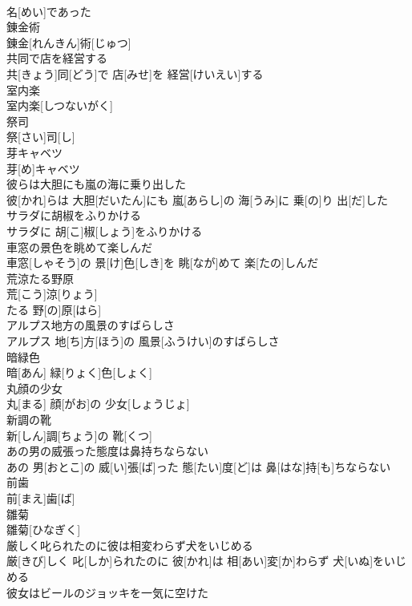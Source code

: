 \documentclass[8pt]{extreport}
\begin{document}
\begin{CJK}{UTF8}{min}
\\	名[めい]であった
\\	錬金術	
\\	錬金[れんきん]術[じゅつ]
\\	共同で店を経営する	
\\	共[きょう]同[どう]で 店[みせ]を 経営[けいえい]する
\\	室内楽	
\\	室内楽[しつないがく]
\\	祭司	
\\	祭[さい]司[し]
\\	芽キャベツ	
\\	芽[め]キャベツ
\\	彼らは大胆にも嵐の海に乗り出した	
\\	彼[かれ]らは 大胆[だいたん]にも 嵐[あらし]の 海[うみ]に 乗[の]り 出[だ]した
\\	サラダに胡椒をふりかける	
\\	サラダに 胡[こ]椒[しょう]をふりかける
\\	車窓の景色を眺めて楽しんだ	
\\	車窓[しゃそう]の 景[け]色[しき]を 眺[なが]めて 楽[たの]しんだ
\\	荒涼たる野原	
\\	荒[こう]涼[りょう]
\\	たる 野[の]原[はら]
\\	アルプス地方の風景のすばらしさ	
\\	アルプス 地[ち]方[ほう]の 風景[ふうけい]のすばらしさ
\\	暗緑色	
\\	暗[あん] 緑[りょく]色[しょく]
\\	丸顔の少女	
\\	丸[まる] 顔[がお]の 少女[しょうじょ]
\\	新調の靴	
\\	新[しん]調[ちょう]の 靴[くつ]
\\	あの男の威張った態度は鼻持ちならない	
\\	あの 男[おとこ]の 威[い]張[ば]った 態[たい]度[ど]は 鼻[はな]持[も]ちならない
\\	前歯	
\\	前[まえ]歯[ば]
\\	雛菊	
\\	雛菊[ひなぎく]
\\	厳しく叱られたのに彼は相変わらず犬をいじめる	
\\	厳[きび]しく 叱[しか]られたのに 彼[かれ]は 相[あい]変[か]わらず 犬[いぬ]をいじめる
\\	彼女はビールのジョッキを一気に空けた	

\end{CJK}
\end{document}
